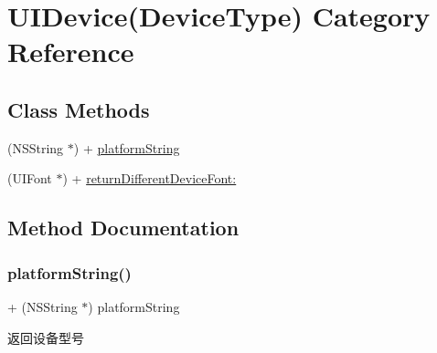 \hypertarget{category_u_i_device_07_device_type_08}{}\section{U\+I\+Device(Device\+Type) Category Reference}
\label{category_u_i_device_07_device_type_08}
\subsection*{Class Methods}
\begin{DoxyCompactItemize}
\item 
(N\+S\+String $\ast$) + \mbox{\hyperlink{category_u_i_device_07_device_type_08_a597f7c8ac287fa9bab566e1330447d5a}{platform\+String}}
\item 
(U\+I\+Font $\ast$) + \mbox{\hyperlink{category_u_i_device_07_device_type_08_a5e79272d6a26580b1f0cead2f3ff2dbd}{return\+Different\+Device\+Font\+:}}
\end{DoxyCompactItemize}


\subsection{Method Documentation}
\mbox{\label{category_u_i_device_07_device_type_08_a597f7c8ac287fa9bab566e1330447d5a}} 
\subsubsection{\texorpdfstring{platform\+String()}{platformString()}}
{\footnotesize\ttfamily + (N\+S\+String $\ast$) platform\+String \begin{DoxyParamCaption}{ }\end{DoxyParamCaption}}

返回设备型号 \mbox{\label{category_u_i_device_07_device_type_08_a5e79272d6a26580b1f0cead2f3ff2dbd}} 
